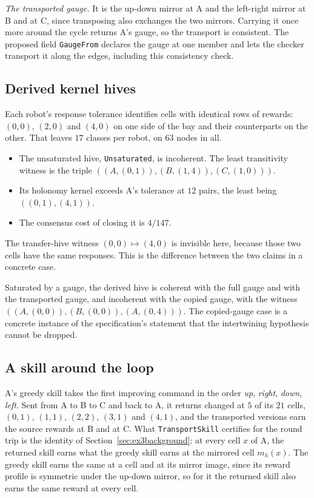 \documentclass[11pt]{article}
\newcommand{\code}[1]{\texttt{#1}}
\theoremstyle{definition}
\theoremstyle{plain}
\begin{document}
\emph{The transported gauge.} It is the up-down mirror at A and the left-right mirror at B and at C,
since transposing also exchanges the two mirrors. Carrying it once more around the cycle returns A's
gauge, so the transport is consistent. The proposed field \code{GaugeFrom} declares the gauge at one
member and lets the checker transport it along the edges, including this consistency check.

\subsection{Derived kernel hives}

Each robot's response tolerance identifies cells with identical rows of rewards: $(0,0)$, $(2,0)$
and $(4,0)$ on one side of the bay and their counterparts on the other. That leaves $17$ classes per
robot, on $63$ nodes in all.
\begin{itemize}
\item The unsaturated hive, \code{Unsaturated}, is incoherent. The least transitivity witness is the
triple $((A,(0,1)),(B,(1,4)),(C,(1,0)))$.
\item Its holonomy kernel exceeds A's tolerance at $12$ pairs, the least being $((0,1),(4,1))$.
\item The consensus cost of closing it is $4/147$.
\end{itemize}
The transfer-hive witness $(0,0)\mapsto(4,0)$ is invisible here, because those two cells have the
same responses. This is the difference between the two claims in a concrete case.

Saturated by a gauge, the derived hive is coherent with the full gauge and with the transported
gauge, and incoherent with the copied gauge, with the witness $((A,(0,0)),(B,(0,0)),(A,(0,4)))$. The
copied-gauge case is a concrete instance of the specification's statement that the intertwining
hypothesis cannot be dropped.

\subsection{A skill around the loop}

A's greedy skill takes the first improving command in the order \emph{up}, \emph{right},
\emph{down}, \emph{left}. Sent from A to B to C and back to A, it returns changed at $5$ of its $21$
cells, $(0,1)$, $(1,1)$, $(2,2)$, $(3,1)$ and $(4,1)$, and the transported versions earn the source
rewards at B and at C. What \code{TransportSkill} certifies for the round trip is the identity of
Section~\ref{sec:ex3background}: at every cell $x$ of A, the returned skill earns what the greedy
skill earns at the mirrored cell $m_h(x)$. The greedy skill earns the same at a cell and at its
mirror image, since its reward profile is symmetric under the up-down mirror, so for it the returned
skill also earns the same reward at every cell.
\end{document}
